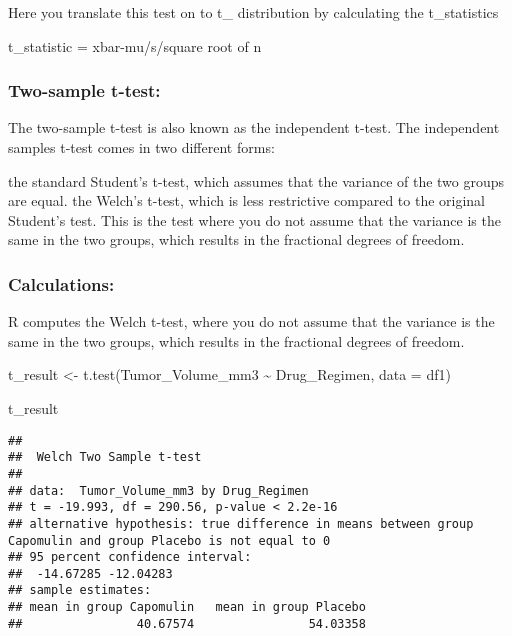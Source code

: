 \documentclass[
]{article}
\newenvironment{Shaded}{\begin{snugshade}}{\end{snugshade}}
\newcommand{\AttributeTok}[1]{\textcolor[rgb]{0.77,0.63,0.00}{#1}}
\newcommand{\FunctionTok}[1]{\textcolor[rgb]{0.00,0.00,0.00}{#1}}
\newcommand{\NormalTok}[1]{#1}
\newcommand{\OtherTok}[1]{\textcolor[rgb]{0.56,0.35,0.01}{#1}}
\newcommand{\SpecialCharTok}[1]{\textcolor[rgb]{0.00,0.00,0.00}{#1}}
\begin{document}
Here you translate this test on to t\_ distribution by calculating the
t\_statistics

t\_statistic = xbar-mu/s/square root of n

\hypertarget{two-sample-t-test}{%
\subsubsection{Two-sample t-test:}\label{two-sample-t-test}}

The two-sample t-test is also known as the independent t-test. The
independent samples t-test comes in two different forms:

the standard Student's t-test, which assumes that the variance of the
two groups are equal. the Welch's t-test, which is less restrictive
compared to the original Student's test. This is the test where you do
not assume that the variance is the same in the two groups, which
results in the fractional degrees of freedom.

\hypertarget{calculations}{%
\subsubsection{Calculations:}\label{calculations}}

R computes the Welch t-test, where you do not assume that the variance
is the same in the two groups, which results in the fractional degrees
of freedom.

\begin{Shaded}
\begin{Highlighting}[]
\NormalTok{t\_result }\OtherTok{\textless{}{-}} \FunctionTok{t.test}\NormalTok{(Tumor\_Volume\_mm3 }\SpecialCharTok{\textasciitilde{}}\NormalTok{ Drug\_Regimen, }\AttributeTok{data =}\NormalTok{ df1)}

\NormalTok{t\_result}
\end{Highlighting}
\end{Shaded}

\begin{verbatim}
## 
##  Welch Two Sample t-test
## 
## data:  Tumor_Volume_mm3 by Drug_Regimen
## t = -19.993, df = 290.56, p-value < 2.2e-16
## alternative hypothesis: true difference in means between group Capomulin and group Placebo is not equal to 0
## 95 percent confidence interval:
##  -14.67285 -12.04283
## sample estimates:
## mean in group Capomulin   mean in group Placebo 
##                40.67574                54.03358
\end{verbatim}
\end{document}
